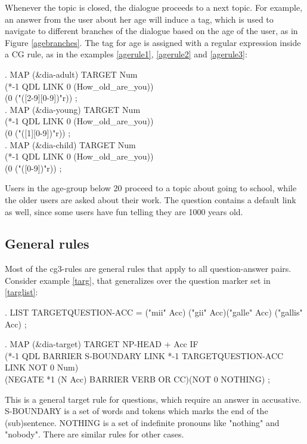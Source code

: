 \documentclass[11pt]{article}
\begin{document}
Whenever the topic is closed, the dialogue proceeds to a next topic. For example, an answer from the user about her age will induce a tag, which is used to navigate to different branches of the dialogue based on the age of the user, as in Figure \ref{agebranches}. The tag for age is assigned with a regular expression inside a CG rule, as in the examples \ref{agerule1}, \ref{agerule2} and \ref{agerule3}: 

\ex.\flushleft\label{agerule1}  \small{MAP (\&dia-adult) TARGET Num \\(*-1 QDL LINK 0 (How\_old\_are\_you)) \\ (0 ("([2-9][0-9])"r)) ;} \\

\ex.\flushleft\label{agerule2} \small{MAP (\&dia-young) TARGET Num \\(*-1 QDL LINK 0 (How\_old\_are\_you))\\ (0 ("([1][0-9])"r)) ;} \\

\ex.\flushleft\label{agerule3} \small{MAP (\&dia-child) TARGET Num \\(*-1 QDL LINK 0 (How\_old\_are\_you)) \\(0 ("([0-9])"r)) ;} 

Users in the age-group below 20 proceed to a topic about going to school, while the older users are asked about their work. The question contains a  default link as well, since some users have fun telling they are 1000 years old.

\subsection{General rules} \label{general} 
Most of the cg3-rules are general rules that apply to all question-answer pairs. Consider example \ref{targ},  that generalizes over the question marker set in \ref{targlist}:

\ex.\flushleft\label{targlist} \small{LIST TARGETQUESTION-ACC = ("mii" Acc) ("gii" Acc)("galle" Acc) ("gallis" Acc) ;}

\ex.\flushleft\label{targ} \small{MAP (\&dia-target) TARGET NP-HEAD + Acc IF \\
(*-1 QDL BARRIER S-BOUNDARY LINK *-1 TARGETQUESTION-ACC LINK NOT 0 Num)\\
(NEGATE *1 (N Acc) BARRIER VERB OR CC)(NOT 0 NOTHING) ;}

This is a general target rule for questions, which require an answer in accusative. S-BOUNDARY is a set of words and tokens which marks the end of the (sub)sentence. NOTHING is a set of indefinite pronouns like "nothing" and "nobody". There are similar rules for other cases. 
\end{document}
